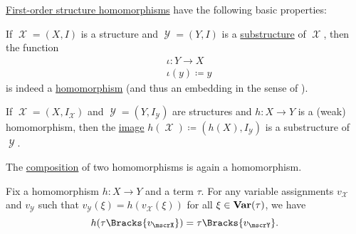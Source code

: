 \begin{proposition}\label{thm:first_order_homomorphism_properties}
  \hyperref[def:first_order_homomorphism]{First-order structure homomorphisms} have the following basic properties:
  \begin{thmenum}
     If \( \mscrX = (X, I) \) is a structure and \( \mscrY = (Y, I) \) is a \hyperref[def:first_order_substructure]{substructure} of \( \mscrX \), then the  function
    \begin{equation}\label{thm:first_order_homomorphism_properties/substructure/canonical_embedding}
      \begin{aligned}
        &\iota: Y \to X \\
        &\iota(y) \coloneqq y
      \end{aligned}
    \end{equation}
    is indeed a \hyperref[def:first_order_homomorphism_invertibility/projection]{homomorphism} (and thus an embedding in the sense of ).

     If \( \mscrX = (X, I_\mscrX) \) and \( \mscrY = (Y, I_\mscrY) \) are structures and \( h: X \to Y \) is a (weak) homomorphism, then the \hyperref[def:function/image]{image} \( h(\mscrX) \coloneqq (h(X), I_\mscrY) \) is a substructure of \( \mscrY \).

     The \hyperref[def:multi_valued_function/composition]{composition} of two homomorphisms is again a homomorphism.

     Fix a homomorphism \( h: X \to Y \) and a term \( \tau \). For any variable assignments \( v_\mscrX \) and \( v_\mscrY \) such that \( v_\mscrY(\xi) = h(v_\mscrX(\xi)) \) for all \( \xi \in \operatorname{\mathbf{Var}}(\tau) \), we have
    \begin{equation*}
      h(\tau\Bracks{v_\mscrX}) = \tau\Bracks{v_\mscrY}.
    \end{equation*}
  \end{thmenum}
\end{proposition}
